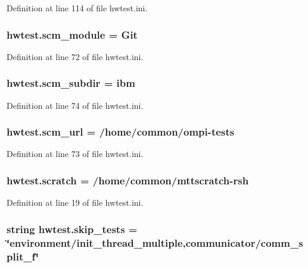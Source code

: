 Definition at line 114 of file hwtest.\-ini.

\hypertarget{namespacehwtest_acb222c4c00407c64de9ba5ab1c303cec}{
\subsubsection[{scm\-\_\-module}]{\setlength{\rightskip}{0pt plus 5cm}hwtest.\-scm\-\_\-module = Git}}\label{namespacehwtest_acb222c4c00407c64de9ba5ab1c303cec}


Definition at line 72 of file hwtest.\-ini.

\hypertarget{namespacehwtest_a7d494d98bb3aaabad59bf16dd7c4c9d2}{
\subsubsection[{scm\-\_\-subdir}]{\setlength{\rightskip}{0pt plus 5cm}hwtest.\-scm\-\_\-subdir = ibm}}\label{namespacehwtest_a7d494d98bb3aaabad59bf16dd7c4c9d2}


Definition at line 74 of file hwtest.\-ini.

\hypertarget{namespacehwtest_a37abe4e88b4c1525a3b343f47dfc2862}{
\subsubsection[{scm\-\_\-url}]{\setlength{\rightskip}{0pt plus 5cm}hwtest.\-scm\-\_\-url = /home/common/ompi-\/tests}}\label{namespacehwtest_a37abe4e88b4c1525a3b343f47dfc2862}


Definition at line 73 of file hwtest.\-ini.

\hypertarget{namespacehwtest_a877f35b716655c4bfeb4955018d305cb}{
\subsubsection[{scratch}]{\setlength{\rightskip}{0pt plus 5cm}hwtest.\-scratch = /home/common/mttscratch-\/rsh}}\label{namespacehwtest_a877f35b716655c4bfeb4955018d305cb}


Definition at line 19 of file hwtest.\-ini.

\hypertarget{namespacehwtest_ae1b5040a9a3c1b72300a18fc85116bc4}{
\subsubsection[{skip\-\_\-tests}]{\setlength{\rightskip}{0pt plus 5cm}string hwtest.\-skip\-\_\-tests = \char`\"{}environment/init\-\_\-thread\-\_\-multiple,communicator/comm\-\_\-split\-\_\-f\char`\"{}}}\label{namespacehwtest_ae1b5040a9a3c1b72300a18fc85116bc4}


